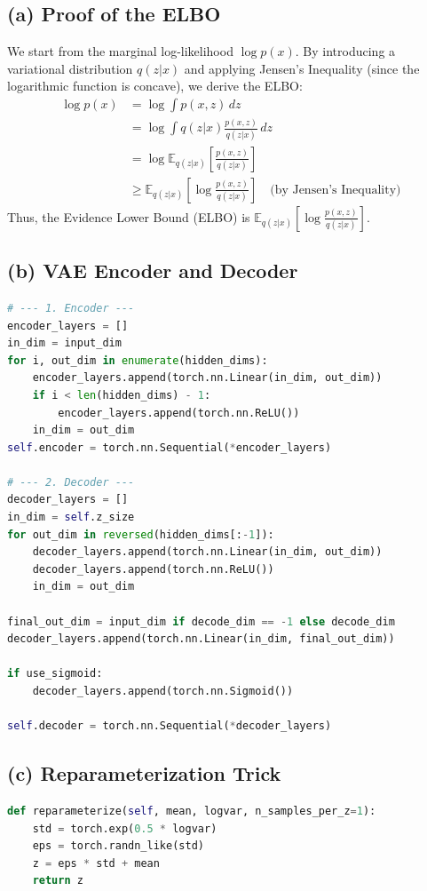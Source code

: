 \documentclass{article}
\begin{document}
\subsection*{(a) Proof of the ELBO}
We start from the marginal log-likelihood $\log p(x)$. By introducing a variational distribution $q(z|x)$ and applying Jensen's Inequality (since the logarithmic function is concave), we derive the ELBO:
\begin{align*}
\log p(x) &= \log \int p(x, z) \, dz \\
&= \log \int q(z|x) \frac{p(x, z)}{q(z|x)} \, dz \\
&= \log \mathbb{E}_{q(z|x)} \left[ \frac{p(x, z)}{q(z|x)} \right] \\
&\geq \mathbb{E}_{q(z|x)} \left[ \log \frac{p(x, z)}{q(z|x)} \right] \quad \text{(by Jensen's Inequality)}
\end{align*}
Thus, the Evidence Lower Bound (ELBO) is $\mathbb{E}_{q(z|x)} \left[ \log \frac{p(x, z)}{q(z|x)} \right]$.

\subsection*{(b) VAE Encoder and Decoder}
\begin{lstlisting}[language=Python]
# --- 1. Encoder ---
encoder_layers = []
in_dim = input_dim
for i, out_dim in enumerate(hidden_dims):
    encoder_layers.append(torch.nn.Linear(in_dim, out_dim))
    if i < len(hidden_dims) - 1:
        encoder_layers.append(torch.nn.ReLU())
    in_dim = out_dim
self.encoder = torch.nn.Sequential(*encoder_layers)

# --- 2. Decoder ---
decoder_layers = []
in_dim = self.z_size
for out_dim in reversed(hidden_dims[:-1]):
    decoder_layers.append(torch.nn.Linear(in_dim, out_dim))
    decoder_layers.append(torch.nn.ReLU())
    in_dim = out_dim
    
final_out_dim = input_dim if decode_dim == -1 else decode_dim
decoder_layers.append(torch.nn.Linear(in_dim, final_out_dim))

if use_sigmoid:
    decoder_layers.append(torch.nn.Sigmoid()) 

self.decoder = torch.nn.Sequential(*decoder_layers)
\end{lstlisting}

\subsection*{(c) Reparameterization Trick}
\begin{lstlisting}[language=Python]
def reparameterize(self, mean, logvar, n_samples_per_z=1):
    std = torch.exp(0.5 * logvar)
    eps = torch.randn_like(std) 
    z = eps * std + mean 
    return z
\end{lstlisting}
\end{document}

